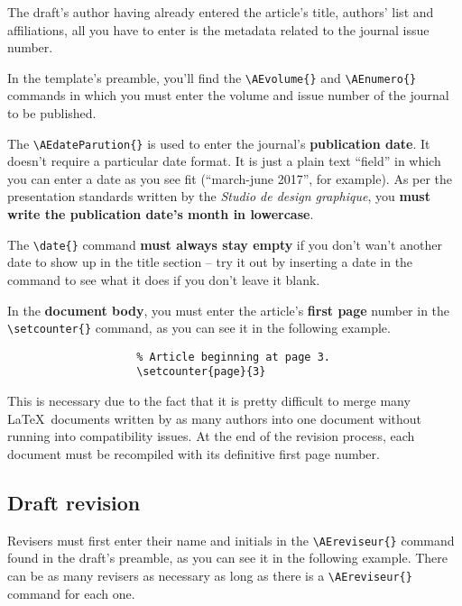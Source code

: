 \documentclass[english]{article}
\newcommand{\cmd}[1]{%
	\texttt{\textbackslash#1\{\}}
}
\begin{document}
			The draft's author having already entered the article's title, authors' list and affiliations, all you have
			to enter is the metadata related to the journal issue number.
			
			In the template's preamble, you'll find the \cmd{AEvolume} and \cmd{AEnumero} commands in which you must enter
			the volume and issue number of the journal to be published.
			
			The \cmd{AEdateParution} is used to enter the journal's \textbf{publication date}. It doesn't
			require a particular date format. It is just a plain text ``field'' in which you can enter a date as you see fit
			(``march-june 2017'', for example). As per the presentation standards written by the 
			\emph{Studio de design graphique}, you \textbf{must write the publication date's month in lowercase}.
			
			The \cmd{date} command \textbf{must always stay empty} if you don't wan't another date to show up 
			in the title section -- try it out by inserting a date in the command to see what it does if you don't
			leave it blank.
			
			In the \textbf{document body}, you must enter the article's \textbf{first page} number in the
			\cmd{setcounter} command, as you can see it in the following example.
			
			\begin{shaded*}
				\begin{verbatim}
					% Article beginning at page 3.
					\setcounter{page}{3}
				\end{verbatim}
			\end{shaded*}
			
			This is necessary due to the fact that it is pretty difficult to merge many \LaTeX\ documents written
			by as many authors into one document without running into compatibility issues. At the end of the
			revision process, each document must be recompiled with its definitive first page number.
			
		\subsection{Draft revision}
		
			Revisers must first enter their name and initials in the \cmd{AEreviseur} command found in the draft's
			preamble, as you can see it in the following example. There can be as many revisers as necessary as
			long as there is a \cmd{AEreviseur} command for each one.
			
\end{document}
